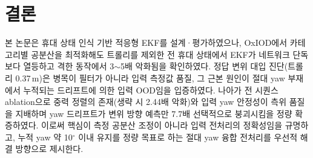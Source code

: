 \documentclass[10pt,twocolumn,a4paper]{article}
\begin{document}
\section{결론}
본 논문은 휴대 상태 인식 기반 적응형 EKF를 설계·평가하였으나, OxIOD에서 카테고리별 공분산을 최적화해도 트롤리를 제외한 전 휴대 상태에서 EKF가 네트워크 단독보다 열등하고 격한 동작에서 3$\sim$5배 악화됨을 확인하였다. 정답 변위 대입 진단(트롤리 0.37\,m)은 병목이 필터가 아니라 입력 측정값 품질, 그 근본 원인이 절대 yaw 부재에서 누적되는 드리프트에 의한 입력 OOD임을 입증하였다. 나아가 전 시퀀스 ablation으로 중력 정렬의 존재(생략 시 2.44배 악화)와 입력 yaw 안정성이 측위 품질을 지배하며 yaw 드리프트가 변위 방향 예측만 7.7배 선택적으로 붕괴시킴을 정량 확증하였다. 이로써 핵심이 측정 공분산 조정이 아니라 입력 전처리의 정확성임을 규명하고, 누적 yaw 약 10$^\circ$ 이내 유지를 정량 목표로 하는 절대 yaw 융합 전처리를 우선적 해결 방향으로 제시한다.



\end{document}
